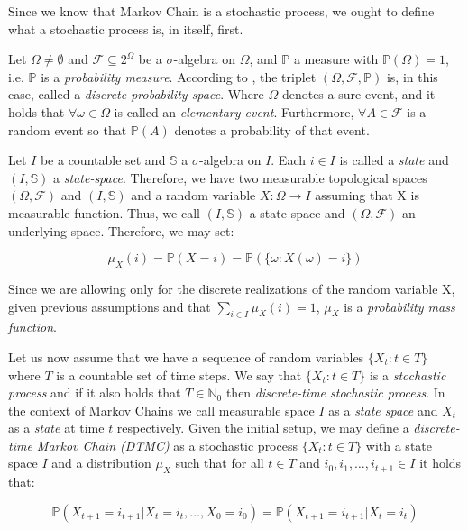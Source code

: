 Since we know that Markov Chain is a stochastic process, we ought to define what a stochastic process is, in itself, first. 

Let $\Omega \neq \emptyset$ and $\mathcal{F} \subseteq 2^{\Omega}$ be a $\sigma$-algebra on $\Omega$, and $\mathbb{P}$ a measure with $\mathbb{P}(\Omega) = 1$, i.e. $\mathbb{P}$ is a \textit{probability measure}. According to \citep{Dostal}, the triplet $(\Omega, \mathcal{F}, \mathbb{P})$ is, in this case, called a \textit{discrete probability space}. Where $\Omega$ denotes a sure event, and it holds that $\forall \omega \in \Omega$ is called an \textit{elementary event}. Furthermore, $\forall A \in \mathcal{F}$ is a random event  so that $\mathbb{P}(A)$ denotes a probability of that event. 

Let $I$ be a countable set and $\mathbb{S}$ a $\sigma$-algebra on $I$. Each $i \in I$ is called a \textit{state} and $(I,\mathbb{S})$ a \textit{state-space}.
Therefore, we have two measurable topological spaces $(\Omega,\mathcal{F})$ and $(I,\mathbb{S})$ and a random variable $X: \Omega \rightarrow I$ assuming that X is measurable function. Thus, we call $(I,\mathbb{S})$ a state space and $(\Omega, \mathcal{F})$ an underlying space. Therefore, we may set:

\begin{equation}
\mu_X(i) = \mathbb{P}(X=i)=\mathbb{P}(\{\omega: X(\omega)=i\})
\end{equation}

Since we are allowing only for the discrete realizations of the random variable X, given previous assumptions and that $\sum\limits_{i \in I} \mu_X(i)=1$, $\mu_X$ is a \textit{probability mass function}.~\citep{Norris2012}

Let us now assume that we have a sequence of random variables $\{X_t : t \in T\}$ where $T$ is a countable set of time steps.
 We say that $\{X_t : t \in T\}$ is a \textit{stochastic process} and if it also holds that $T \in \mathbb{N}_0$ then \textit{discrete-time stochastic process}.
 In the context of Markov Chains we call measurable space $I$ as a \textit{state space} and $X_t$ as a \textit{state} at time $t$ respectively.
 Given the initial setup, we may define a \textit{discrete-time Markov Chain (DTMC)} as a stochastic process $\{X_t : t \in T\}$ with a state space $I$ and a distribution $\mu_X$ such that for all $t \in T$ and $i_0,i_1,\ldots,i_{t+1} \in I$ it holds that:

\begin{equation} \label{eq:DTMC}
    \mathbb{P}(X_{t+1}=i_{t+1}|X_t=i_t,\ldots,X_0=i_0) = \mathbb{P}(X_{t+1}=i_{t+1}|X_t=i_t)
\end{equation}


